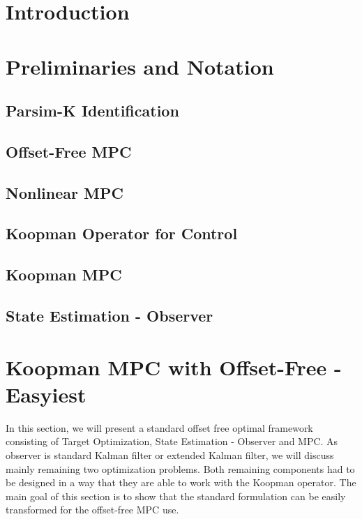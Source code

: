 \documentclass[preprint,12pt,authoryear]{elsarticle}
\begin{document}

\section{Introduction}
\label{sec:intro}

\section{Preliminaries and Notation}
\label{sec:Preliminaries}

\subsection{Parsim-K Identification}
 
\subsection{Offset-Free MPC}

\subsection{Nonlinear MPC}

\subsection{Koopman Operator for Control}

\subsection{Koopman MPC}

\subsection{State Estimation - Observer}

\section{Koopman MPC with Offset-Free - Easyiest}
\label{sec:easy-mpc}
In this section, we will present a standard offset free optimal framework consisting of Target Optimization, State Estimation - Observer and MPC. As observer is standard Kalman filter or extended Kalman filter, we will discuss mainly remaining two optimization problems. Both remaining components had to be designed in a way that they are able to work with the Koopman operator. The main goal of this section is to show that the standard formulation can be easily transformed for the offset-free MPC use.
\end{document}
